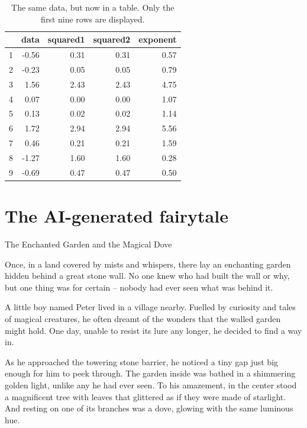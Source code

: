 \documentclass[10pt, a4paper, titlepage]{article}
\begin{document}
\begin{table}[ht]
\centering
\caption{The same data, but now in a table. Only the first nine rows 
are displayed.}
\begin{tabular}{rrrrr}
  \hline
 & data & squared1 & squared2 & exponent \\ 
  \hline
1 & -0.56 & 0.31 & 0.31 & 0.57 \\ 
  2 & -0.23 & 0.05 & 0.05 & 0.79 \\ 
  3 & 1.56 & 2.43 & 2.43 & 4.75 \\ 
  4 & 0.07 & 0.00 & 0.00 & 1.07 \\ 
  5 & 0.13 & 0.02 & 0.02 & 1.14 \\ 
  6 & 1.72 & 2.94 & 2.94 & 5.56 \\ 
  7 & 0.46 & 0.21 & 0.21 & 1.59 \\ 
  8 & -1.27 & 1.60 & 1.60 & 0.28 \\ 
  9 & -0.69 & 0.47 & 0.47 & 0.50 \\ 
   \hline
\end{tabular}
\end{table}

\section*{The AI-generated fairytale}

The Enchanted Garden and the Magical Dove

Once, in a land covered by mists and whispers, there lay an enchanting garden hidden behind a great stone wall. No one knew who had built the wall or why, but one thing was for certain – nobody had ever seen what was behind it.

A little boy named Peter lived in a village nearby. Fuelled by curiosity and tales of magical creatures, he often dreamt of the wonders that the walled garden might hold. One day, unable to resist its lure any longer, he decided to find a way in.

As he approached the towering stone barrier, he noticed a tiny gap just big enough for him to peek through. The garden inside was bathed in a shimmering golden light, unlike any he had ever seen. To his amazement, in the center stood a magnificent tree with leaves that glittered as if they were made of starlight. And resting on one of its branches was a dove, glowing with the same luminous hue.
\end{document}
